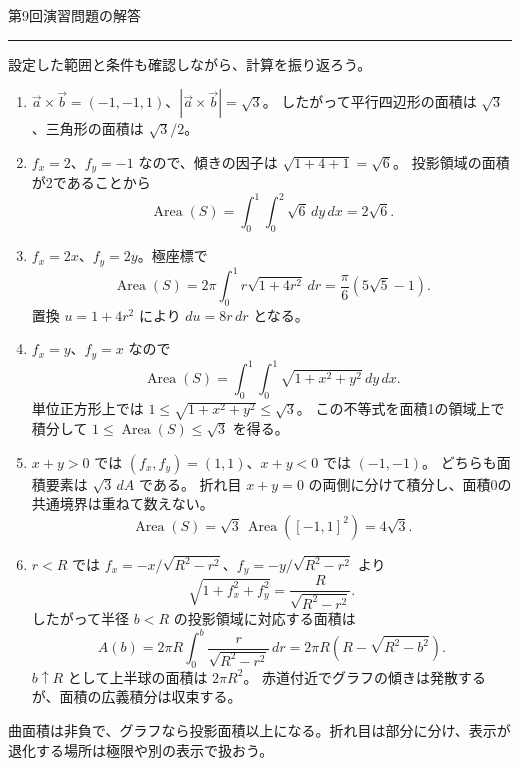 \documentclass[a4paper,10pt,pdflatex,ja=standard,jafont=ipaex-type1,
  magstyle=real,scale=1]{bxjsarticle}
\newcommand{\handouttitle}[1]{%
  \begin{center}
    {\Large\color{ink}#1}\par\vspace{3mm}
    {\color{accent}\rule{0.88\linewidth}{0.7pt}}
  \end{center}\vspace{-2mm}}
\newcommand{\keybox}[1]{\par\vspace{3pt}\begingroup
  \setlength{\fboxsep}{4pt}%
  \colorbox{soft}{\parbox{\dimexpr\linewidth-2\fboxsep\relax}{\small #1}}%
  \endgroup\par\vspace{2pt}}
\newenvironment{problems}
  {\begin{enumerate}[leftmargin=2em,itemsep=3pt,topsep=3pt,parsep=0pt,
    font=\color{accent}]}
  {\end{enumerate}}
\begin{document}
\newpage
\handouttitle{第9回\quad 演習問題の解答}
{\small 設定した範囲と条件も確認しながら、計算を振り返ろう。}\par
\begin{problems}
\setlength{\itemsep}{7pt}
\item $\vec a\times\vec b=(-1,-1,1)$、$|\vec a\times\vec b|=\sqrt3$。
したがって平行四辺形の面積は $\sqrt3$、三角形の面積は $\sqrt3/2$。

\item $f_x=2$、$f_y=-1$ なので、傾きの因子は $\sqrt{1+4+1}=\sqrt6$。
投影領域の面積が2であることから
$$
 \operatorname{Area}(S)=\int_0^1\int_0^2\sqrt6\,dy\,dx=2\sqrt6.
$$

\item $f_x=2x$、$f_y=2y$。極座標で
$$
 \operatorname{Area}(S)=2\pi\int_0^1r\sqrt{1+4r^2}\,dr
 =\frac\pi6(5\sqrt5-1).
$$
置換 $u=1+4r^2$ により $du=8r\,dr$ となる。

\item $f_x=y$、$f_y=x$ なので
$$
 \operatorname{Area}(S)=\int_0^1\int_0^1\sqrt{1+x^2+y^2}\,dy\,dx.
$$
単位正方形上では $1\le\sqrt{1+x^2+y^2}\le\sqrt3$。
この不等式を面積1の領域上で積分して $1\le\operatorname{Area}(S)\le\sqrt3$ を得る。

\item $x+y>0$ では $(f_x,f_y)=(1,1)$、$x+y<0$ では $(-1,-1)$。
どちらも面積要素は $\sqrt3\,dA$ である。
折れ目 $x+y=0$ の両側に分けて積分し、面積0の共通境界は重ねて数えない。
$$
 \operatorname{Area}(S)=\sqrt3\,\operatorname{Area}([-1,1]^2)=4\sqrt3.
$$

\item $r<R$ では $f_x=-x/\sqrt{R^2-r^2}$、$f_y=-y/\sqrt{R^2-r^2}$ より
$$
 \sqrt{1+f_x^2+f_y^2}=\frac R{\sqrt{R^2-r^2}}.
$$
したがって半径 $b<R$ の投影領域に対応する面積は
$$
 A(b)=2\pi R\int_0^b\frac{r}{\sqrt{R^2-r^2}}\,dr
 =2\pi R\left(R-\sqrt{R^2-b^2}\right).
$$
$b\uparrow R$ として上半球の面積は $2\pi R^2$。
赤道付近でグラフの傾きは発散するが、面積の広義積分は収束する。
\end{problems}
\keybox{曲面積は非負で、グラフなら投影面積以上になる。折れ目は部分に分け、表示が退化する場所は極限や別の表示で扱おう。}
\end{document}
